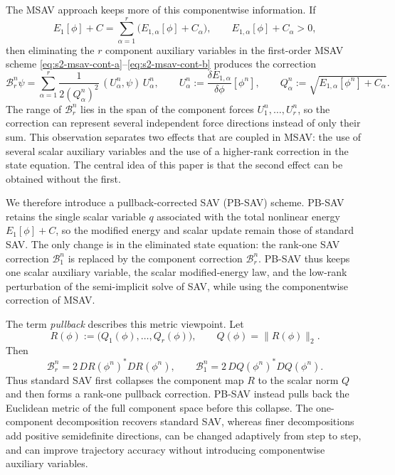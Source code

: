 \documentclass[10pt,onefignum,onetabnum,hidelinks]{siamart251216}
\begin{document}
The MSAV approach keeps more of this componentwise information.  If
\[
    E_1[\phi]+C
    =
    \sum_{\alpha=1}^{r}\bigl(E_{1,\alpha}[\phi]+C_\alpha\bigr),
    \qquad
    E_{1,\alpha}[\phi]+C_\alpha>0,
\]
then eliminating the $r$ component auxiliary variables in the first-order MSAV scheme \eqref{eq:s2-msav-cont-a}--\eqref{eq:s2-msav-cont-b} produces the correction
\[
    \mathcal B_r^n\psi
    =
    \sum_{\alpha=1}^{r}
    \frac{1}{2(Q_\alpha^n)^2}\,(U_\alpha^n,\psi)\,U_\alpha^n,
    \qquad
    U_\alpha^n:=\frac{\delta E_{1,\alpha}}{\delta\phi}[\phi^n],
    \qquad
    Q_\alpha^n:=\sqrt{E_{1,\alpha}[\phi^n]+C_\alpha}.
\]
The range of $\mathcal B_r^n$ lies in the span of the component forces $U_1^n,\ldots,U_r^n$, so the correction can represent several independent force directions instead of only their sum.  This observation separates two effects that are coupled in MSAV: the use of several scalar auxiliary variables and the use of a higher-rank correction in the state equation.  The central idea of this paper is that the second effect can be obtained without the first.

We therefore introduce a pullback-corrected SAV (PB-SAV) scheme.  PB-SAV retains the single scalar variable $q$ associated with the total nonlinear energy $E_1[\phi]+C$, so the modified energy and scalar update remain those of standard SAV.  The only change is in the eliminated state equation: the rank-one SAV correction $\mathcal B_1^n$ is replaced by the component correction $\mathcal B_r^n$. PB-SAV thus keeps one scalar auxiliary variable, the scalar modified-energy law, and the low-rank perturbation of the semi-implicit solve of SAV, while using the componentwise correction of MSAV.

The term \emph{pullback} describes this metric viewpoint.  Let
\[
    R(\phi):=\bigl(Q_1(\phi),\ldots,Q_r(\phi)\bigr),
    \qquad
    Q(\phi)=\|R(\phi)\|_2.
\]
Then
\[
    \mathcal B_r^n=2\,DR(\phi^n)^*DR(\phi^n),
    \qquad
    \mathcal B_1^n=2\,DQ(\phi^n)^*DQ(\phi^n).
\]
Thus standard SAV first collapses the component map $R$ to the scalar norm $Q$ and then forms a rank-one pullback correction.  PB-SAV instead pulls back the Euclidean metric of the full component space before this collapse.  The one-component decomposition recovers standard SAV, whereas finer decompositions add positive semidefinite directions, can be changed adaptively from step to step, and can improve trajectory accuracy without introducing componentwise auxiliary variables.
\end{document}
